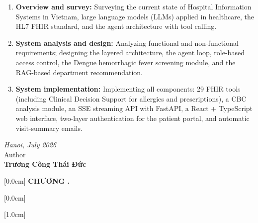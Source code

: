 \documentclass[a4paper,13pt,3p,twoside,openany]{report}
\theoremstyle{definition}
\theoremstyle{remark}
\theoremstyle{definition}
\begin{document}
\begin{enumerate}
\item \textbf{Overview and survey:} Surveying the current state of Hospital Information Systems in Vietnam, large language models (LLMs) applied in healthcare, the HL7 FHIR standard, and the agent architecture with tool calling.

\item \textbf{System analysis and design:} Analyzing functional and non-functional requirements; designing the layered architecture, the agent loop, role-based access control, the Dengue hemorrhagic fever screening module, and the RAG-based department recommendation.

\item \textbf{System implementation:} Implementing all components: 29 FHIR tools (including Clinical Decision Support for allergies and prescriptions), a CBC analysis module, an SSE streaming API with FastAPI, a React + TypeScript web interface, two-layer authentication for the patient portal, and automatic visit-summary emails.
\end{enumerate}

\hspace{0.5\textwidth}
\begin{minipage}{0.5\textwidth}
	\noindent\begin{center}
		\vspace{1cm}
		\textit{Hanoi, July 2026} \\
		Author\\ \vspace{2cm}
		\textbf{Trương Công Thái Đức}
	\end{center}
\end{minipage}

\newpage
{}
\renewcommand*\contentsname{MỤC LỤC}
    [0.0cm]
    {\bfseries\vspace{0.3cm}}
    {{\bfseries{\scshape} CHƯƠNG \thecontentslabel.\ }}
    {}
    {\contentspage}

    [0.0cm]
    {\vspace{0.3cm}}
    {\thecontentslabel \ }
    {}
    {\contentspage}

    [1.0cm]
    {\vspace{0.3cm}}
    {\thecontentslabel \ }
    {}
    {\contentspage}
\end{document}
